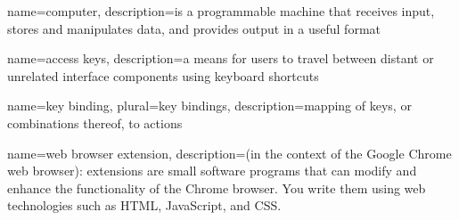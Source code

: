 {
  name=computer,
  description={is a programmable machine that receives input,
               stores and manipulates data, and provides
               output in a useful format}
}





{
  name=access keys,
  description={a means for users to travel between distant or unrelated interface components using keyboard shortcuts}
}

{
  name=key binding,
  plural=key bindings,
  description={mapping of keys, or combinations thereof, to actions}
}

{
  name=web browser extension,
  description={(in the context of the Google Chrome web browser): extensions are small software programs that can modify and enhance the functionality of the Chrome browser. You write them using web technologies such as HTML, JavaScript, and CSS.}
}